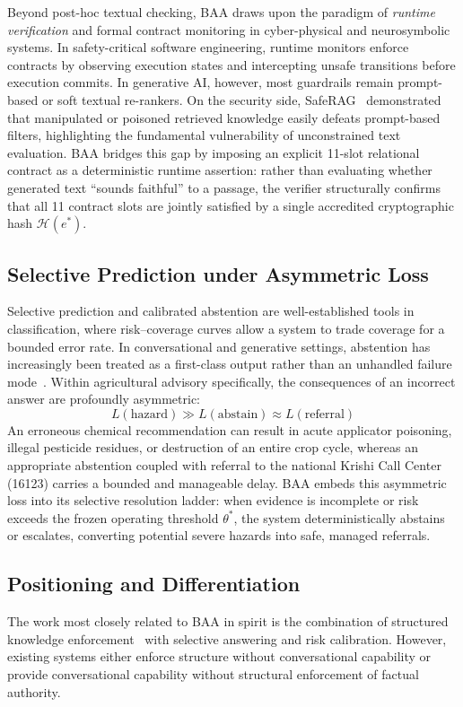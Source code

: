 Beyond post-hoc textual checking, BAA draws upon the paradigm of \emph{runtime verification} and formal contract monitoring in cyber-physical and neurosymbolic systems. In safety-critical software engineering, runtime monitors enforce contracts by observing execution states and intercepting unsafe transitions before execution commits. In generative AI, however, most guardrails remain prompt-based or soft textual re-rankers. On the security side, SafeRAG~\citep{saferag2025} demonstrated that manipulated or poisoned retrieved knowledge easily defeats prompt-based filters, highlighting the fundamental vulnerability of unconstrained text evaluation. BAA bridges this gap by imposing an explicit 11-slot relational contract as a deterministic runtime assertion: rather than evaluating whether generated text ``sounds faithful'' to a passage, the verifier structurally confirms that all 11 contract slots are jointly satisfied by a single accredited cryptographic hash $\mathcal{H}(e^*)$.

\subsection{Selective Prediction under Asymmetric Loss}
Selective prediction and calibrated abstention are well-established tools in classification, where risk--coverage curves allow a system to trade coverage for a bounded error rate. In conversational and generative settings, abstention has increasingly been treated as a first-class output rather than an unhandled failure mode~\citep{generateverify2025}. Within agricultural advisory specifically, the consequences of an incorrect answer are profoundly asymmetric:
\begin{equation}
    L(\text{hazard}) \gg L(\text{abstain}) \approx L(\text{referral})
\end{equation}
An erroneous chemical recommendation can result in acute applicator poisoning, illegal pesticide residues, or destruction of an entire crop cycle, whereas an appropriate abstention coupled with referral to the national Krishi Call Center (16123) carries a bounded and manageable delay. BAA embeds this asymmetric loss into its selective resolution ladder: when evidence is incomplete or risk exceeds the frozen operating threshold $\theta^*$, the system deterministically abstains or escalates, converting potential severe hazards into safe, managed referrals.

\subsection{Positioning and Differentiation}
The work most closely related to BAA in spirit is the combination of structured knowledge enforcement~\citep{goatrag2026,dssatlm2026} with selective answering and risk calibration. However, existing systems either enforce structure without conversational capability or provide conversational capability without structural enforcement of factual authority. 

